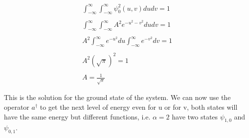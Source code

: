\begin{equation}
  \begin{array}{c}
    \int_{-\infty}^{\infty}\int_{-\infty}^{\infty} \psi_0^2(u,v) du dv = 1
    \\

    \\
    \int_{-\infty}^{\infty}\int_{-\infty}^{\infty} A^2 e^{-u^2-v^2} du dv = 1
    \\

    \\
    A^2 \int_{-\infty}^{\infty} e^{-u^2} du \int_{-\infty}^{\infty} e^{-v^2} dv = 1
    \\

    \\
    A^2 \left(\sqrt{\pi}\right)^2 = 1
    \\

    \\
    A = \frac{1}{\sqrt{\pi}}
  \end{array}
\end{equation}

This is the solution for the ground state of the system. We can now use the operator $a^{\dagger}$ to get the next level of energy even for u or for v, both states will have the same energy but different functions, i.e. $\alpha=2$ have two states $\psi_{1,0}$ and $\psi_{0,1}$.








